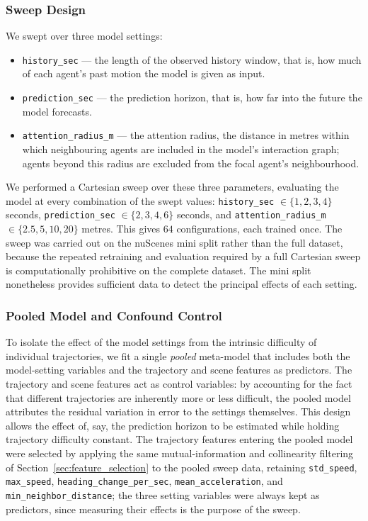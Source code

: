 \documentclass[12pt]{article}
\begin{document}
\subsubsection{Sweep Design}

We swept over three model settings:
\begin{itemize}
  \item \texttt{history\_sec} — the length of the observed history window, that is, how much of each agent's past motion the model is given as input.
  \item \texttt{prediction\_sec} — the prediction horizon, that is, how far into the future the model forecasts.
  \item \texttt{attention\_radius\_m} — the attention radius, the distance in metres within which neighbouring agents are included in the model's interaction graph; agents beyond this radius are excluded from the focal agent's neighbourhood.
\end{itemize}

We performed a Cartesian sweep over these three parameters, evaluating the model at every combination of the swept values: \texttt{history\_sec} $\in \{1, 2, 3, 4\}$ seconds, \texttt{prediction\_sec} $\in \{2, 3, 4, 6\}$ seconds, and \texttt{attention\_radius\_m} $\in \{2.5, 5, 10, 20\}$ metres. This gives $64$ configurations, each trained once. The sweep was carried out on the nuScenes mini split rather than the full dataset, because the repeated retraining and evaluation required by a full Cartesian sweep is computationally prohibitive on the complete dataset. The mini split nonetheless provides sufficient data to detect the principal effects of each setting.

\subsubsection{Pooled Model and Confound Control}

To isolate the effect of the model settings from the intrinsic difficulty of individual trajectories, we fit a single \emph{pooled} meta-model that includes both the model-setting variables and the trajectory and scene features as predictors. The trajectory and scene features act as control variables: by accounting for the fact that different trajectories are inherently more or less difficult, the pooled model attributes the residual variation in error to the settings themselves. This design allows the effect of, say, the prediction horizon to be estimated while holding trajectory difficulty constant. The trajectory features entering the pooled model were selected by applying the same mutual-information and collinearity filtering of Section~\ref{sec:feature_selection} to the pooled sweep data, retaining \texttt{std\_speed}, \texttt{max\_speed}, \texttt{heading\_change\_per\_sec}, \texttt{mean\_acceleration}, and \texttt{min\_neighbor\_distance}; the three setting variables were always kept as predictors, since measuring their effects is the purpose of the sweep.
\end{document}
